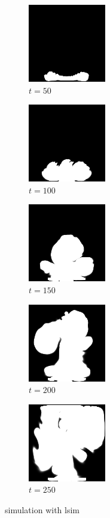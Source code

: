 \documentclass[a4paper,12pt,twoside]{report}
\begin{document}
\begin{figure}
\centering
\begin{subfigure}{0.18\textwidth}
  \centering
  \includegraphics[scale=0.56]{buoyancy_test/dens_000050_lsim.png}
  \caption{$t=50$}
\end{subfigure}
\begin{subfigure}{0.18\textwidth}
  \centering
  \includegraphics[scale=0.56]{buoyancy_test/dens_000100_lsim.png}
  \caption{$t=100$}
\end{subfigure}
\begin{subfigure}{0.18\textwidth}
  \centering
  \includegraphics[scale=0.56]{buoyancy_test/dens_000150_lsim.png}
  \caption{$t=150$}
\end{subfigure}
\begin{subfigure}{0.18\textwidth}
  \centering
  \includegraphics[scale=0.56]{buoyancy_test/dens_000200_lsim.png}
  \caption{$t=200$}
\end{subfigure}
\begin{subfigure}{0.18\textwidth}
  \centering
  \includegraphics[scale=0.56]{buoyancy_test/dens_000249_lsim.png}
  \caption{$t=250$}
\end{subfigure}
\caption{simulation with lsim}
\label{sol buoyancy high lsim}
\end{figure}
\end{document}
